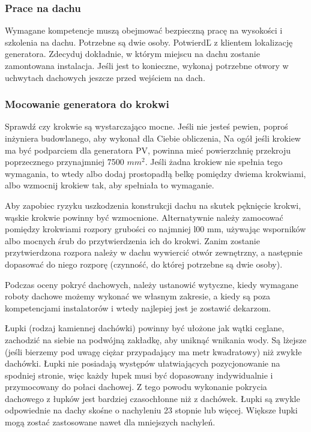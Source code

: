 \documentclass[12pt,a4paper]{article}
\begin{document}
 

\subsubsection{Prace na dachu }
Wymagane kompetencje muszą obejmować bezpieczną pracę na wysokości i 
szkolenia na dachu. Potrzebne są dwie osoby. PotwierdĽ z klientem 
lokalizację generatora. Zdecyduj dokładnie, w którym miejscu na dachu 
zostanie zamontowana instalacja. Jeśli jest to konieczne, wykonaj 
potrzebne otwory w uchwytach dachowych jeszcze przed wejściem na dach. 

 

\subsubsection{Mocowanie generatora do krokwi }


Sprawdź czy krokwie są wystarczająco mocne. Jeśli nie jesteś pewien, 
poproś inżyniera budowlanego, aby wykonał dla Ciebie obliczenia, Na ogół 
jeśli krokiew ma być podparciem dla generatora PV, powinna mieć 
powierzchnię przekroju poprzecznego przynajmniej 7500 ${mm^{2}}$. Jeśli żadna 
krokiew nie spełnia tego wymagania, to wtedy albo dodaj prostopadłą 
belkę pomiędzy dwiema krokwiami, albo wzmocnij krokiew tak, aby 
spełniała to wymaganie. 

Aby zapobiec ryzyku uszkodzenia konstrukcji dachu na skutek pęknięcie 
krokwi, wąskie krokwie powinny być wzmocnione. Alternatywnie należy 
zamocować pomiędzy krokwiami rozpory grubości co najmniej l00 mm, 
używając wsporników albo mocnych śrub do przytwierdzenia ich do krokwi. 
Zanim zostanie przytwierdzona rozpora należy w dachu wywiercić otwór 
zewnętrzny, a następnie dopasować do niego rozporę (czynność, do której 
potrzebne są dwie osoby). 


Podczas oceny pokryć dachowych, należy ustanowić wytyczne, kiedy 
wymagane roboty dachowe możemy wykonać we własnym zakresie, a kiedy są 
poza kompetencjami instalatorów i wtedy najlepiej jest je zostawić 
dekarzom. 
 

Łupki (rodzaj kamiennej dachówki) powinny być ułożone jak wątki ceglane, 
zachodzić na siebie na podwójną zakładkę, aby uniknąć wnikania wody. Są 
lżejsze (jeśli bierzemy pod uwagę ciężar przypadający ma metr 
kwadratowy) niż zwykłe dachówki. Łupki nie posiadają występów 
ułatwiających pozycjonowanie na spodniej stronie, więc każdy łupek musi 
być dopasowany indywidualnie i przymocowany do połaci dachowej. Z tego 
powodu wykonanie pokrycia dachowego z łupków jest bardziej czasochłonne 
niż z dachówek. Łupki są zwykle odpowiednie na dachy skośne o nachyleniu 
23 stopnie lub więcej. Większe łupki mogą zostać zastosowane nawet dla 
mniejszych nachyleń. 
\end{document}
